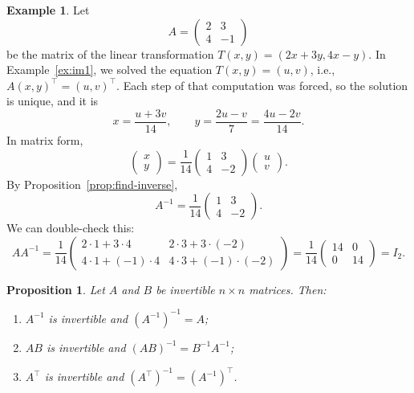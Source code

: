 \documentclass[11pt]{article}
\theoremstyle{definition}
\newtheorem{example}[definition]{Example}
\theoremstyle{plain}
\newtheorem{proposition}[definition]{Proposition}
\theoremstyle{remark}
\begin{document}
\begin{example}\label{ex:inverse2x2}
    Let
    \[A = \begin{pmatrix}
        2 & 3 \\
        4 & -1
    \end{pmatrix}\]
    be the matrix of the linear transformation $T(x, y) = (2x + 3y, 4x - y)$. In Example~\ref{ex:im1}, we solved the equation $T(x, y) = (u, v)$, i.e., $A(x, y)^\top = (u, v)^\top$. Each step of that computation was forced, so the solution is unique, and it is
    \[x = \frac{u + 3v}{14}, \qquad y = \frac{2u - v}{7} = \frac{4u - 2v}{14}.\]
    In matrix form,
    \[\begin{pmatrix}
        x \\
        y
    \end{pmatrix} = \frac{1}{14} \begin{pmatrix}
        1 & 3 \\
        4 & -2
    \end{pmatrix} \begin{pmatrix}
        u \\
        v
    \end{pmatrix}.\]
    By Proposition~\ref{prop:find-inverse},
    \[A^{-1} = \frac{1}{14} \begin{pmatrix}
        1 & 3 \\
        4 & -2
    \end{pmatrix}.\]
    We can double-check this:
    \[A A^{-1} = \frac{1}{14} \begin{pmatrix}
        2 \cdot 1 + 3 \cdot 4 & 2 \cdot 3 + 3 \cdot (-2) \\
        4 \cdot 1 + (-1) \cdot 4 & 4 \cdot 3 + (-1) \cdot (-2)
    \end{pmatrix} = \frac{1}{14} \begin{pmatrix}
        14 & 0 \\
        0 & 14
    \end{pmatrix} = I_2.\]
\end{example}

\begin{proposition}\label{prop:inverse-props}
    Let $A$ and $B$ be invertible $n \times n$ matrices. Then:
    \begin{enumerate}
        \item $A^{-1}$ is invertible and $(A^{-1})^{-1} = A$;
        \item $AB$ is invertible and $(AB)^{-1} = B^{-1} A^{-1}$;
        \item $A^\top$ is invertible and $(A^\top)^{-1} = (A^{-1})^\top$.
    \end{enumerate}
\end{proposition}
\end{document}
